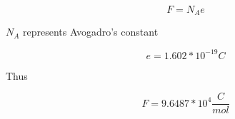 \documentclass[11pt]{article}
\begin{document}
	\begin{equation}
		F = N_{A}e
	\end{equation}
	
	\begin{center}
		$N_{A}$ represents Avogadro's constant	
	\end{center}
	
	\begin{equation}
		e = 1.602*10^{-19}C
	\end{equation}
	
	\begin{center}
		Thus
	\end{center}
	
	\begin{equation}
		F = 9.6487*10^{4} \frac{C}{mol}
	\end{equation}
\end{document}
